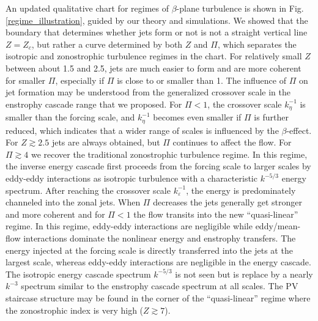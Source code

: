 \documentclass{jfm}
\begin{document}
An updated qualitative chart for regimes of $\beta$-plane turbulence is shown
in Fig. \ref{regime_illustration}, guided by our theory and simulations.
We showed that the boundary that determines whether jets form or not is not a
straight vertical line $Z=Z_{c}$, but rather a curve determined by
both $Z$ and $\Pi$, which separates the isotropic and zonostrophic turbulence
regimes in the chart. For relatively small $Z$ between about 1.5 and
2.5, jets are much easier to form and are more coherent for smaller
$\Pi$, especially if $\Pi$ is close to or smaller than 1. The influence
of $\Pi$ on jet formation may be understood from the generalized crossover scale
in the enstrophy cascade range that we proposed. For $\Pi<1$, the
crossover scale $k_{\eta}^{-1}$ is smaller than the forcing scale,
and $k_{\eta}^{-1}$ becomes even smaller if $\Pi$ is further reduced,
which indicates that a wider range of scales is influenced by the $\beta$-effect.
For $Z\apprge2.5$ jets are always obtained, but $\Pi$ continues to affect the flow. 
For $\Pi\apprge 4$ we recover the traditional  zonostrophic turbulence regime. 
In this regime, the inverse energy cascade first proceeds from the
forcing scale to larger scales by eddy-eddy interactions as isotropic
turbulence with a characteristic $k^{-5/3}$ energy spectrum. After
reaching the crossover scale $k_{\varepsilon}^{-1}$, the energy is predominately
channeled into the zonal jets. When $\Pi$ decreases the jets generally get stronger
and more coherent and for $\Pi<1$ the flow transits into
the new ``quasi-linear'' regime. In this regime, eddy-eddy interactions
are negligible while eddy/mean-flow interactions dominate the nonlinear
energy and enstrophy transfers. The energy injected at the forcing
scale is directly transferred into the jets at the largest scale, whereas
eddy-eddy interactions are negligible in the energy cascade. The isotropic
energy cascade spectrum $k^{-5/3}$ is not seen but is replace by
a nearly $k^{-3}$ spectrum similar to the enstrophy cascade spectrum
at all scales. %
The PV staircase 
structure may be found in the corner of the ``quasi-linear'' 
regime where the zonostrophic index is very high ($Z\apprge7$).
\end{document}
